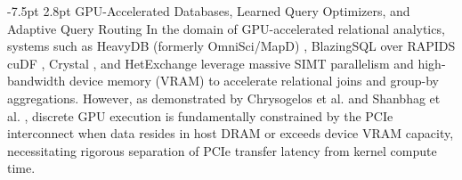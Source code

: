 \documentclass[10pt,a4paper]{article}
\makeatletter
\renewcommand\subsection{\@startsection{subsection}{2}{\z@}%
  {-7.5pt \@plus -2pt \@minus -1pt}%
  {2.8pt \@plus 1pt}%
  {\normalfont\normalsize\bfseries}}
\makeatother
\begin{document}
\subsection{GPU-Accelerated Databases, Learned Query Optimizers, and Adaptive Query Routing}
In the domain of GPU-accelerated relational analytics, systems such as HeavyDB (formerly OmniSci/MapD) \cite{root2019mapd}, BlazingSQL over RAPIDS cuDF \cite{kim2022blazingsql}, Crystal \cite{shanbhag2020crystal}, and HetExchange \cite{chrysogelos2019hetexchange} leverage massive SIMT parallelism and high-bandwidth device memory (VRAM) to accelerate relational joins and group-by aggregations. However, as demonstrated by Chrysogelos et al. \cite{chrysogelos2019hetexchange} and Shanbhag et al. \cite{shanbhag2020crystal}, discrete GPU execution is fundamentally constrained by the PCIe interconnect when data resides in host DRAM or exceeds device VRAM capacity, necessitating rigorous separation of PCIe transfer latency from kernel compute time.
\end{document}
